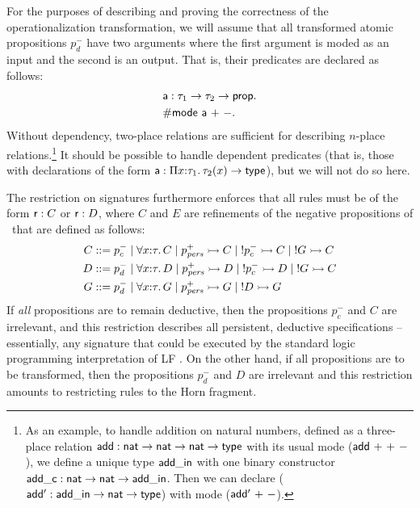 For the purposes of describing and proving the correctness of the
operationalization transformation, we will assume that all transformed
atomic propositions $p_d^-$ have two arguments where the first
argument is moded as an input and the second is an output. That is,
their predicates are declared as follows:
\begin{align*}
& {\sf a} : \tau_1 \rightarrow \tau_2 \rightarrow {\sf prop}.\\
& {\sf \#mode~a~{+}~{-}}.
\end{align*}
Without dependency, two-place relations are sufficient for describing
$n$-place relations.\footnote{As an example, to handle addition on
  natural numbers, defined as a three-place relation ${\sf add} : {\sf
    nat} \rightarrow {\sf nat} \rightarrow {\sf nat} \rightarrow {\sf
    type}$ with its usual mode (${\sf add}~{+}~{+}~{-}$), we define a
  unique type ${\sf add\_in}$ with one binary constructor ${\sf
    add\_c} : {\sf nat} \rightarrow {\sf nat} \rightarrow {\sf
    add\_in}$. Then we can declare (${\sf add'} : {\sf add\_in}
  \rightarrow {\sf nat} \rightarrow {\sf type}$) with mode (${\sf
    add'}~{+}~{-}$).}  It should be possible to handle dependent
predicates (that is, those with declarations of the form ${\sf a} :
\Pi x{:}\tau_1.\,\tau_2(x) \rightarrow {\sf type}$), but we will not do
so here.

The restriction on signatures furthermore enforces that all rules must
be of the form ${\sf r} : C$ or ${\sf r} : D$, where $C$ and $E$ are
refinements of the negative propositions of \sls~that are defined as
follows:
\begin{align*}
C & ::= p^-_{c} 
    \mid \forall x{:}\tau.\, C
    \mid p^+_{\it pers} \rightarrowtail C
    \mid {!}p^-_c \rightarrowtail C
    \mid {!}G \rightarrowtail C \\
D & ::= p^-_{d}
    \mid \forall x{:}\tau.\, D
    \mid p^+_{\it pers} \rightarrowtail D
    \mid {!}p^-_c \rightarrowtail D
    \mid {!}G \rightarrowtail C \\
G & ::= p^-_d 
    \mid \forall x{:}\tau.\, G
    \mid p^+_{\it pers} \rightarrowtail G
    \mid {!}D \rightarrowtail G
\end{align*}
If {\it all} propositions are to remain deductive, then the
propositions $p^-_c$ and $C$ are irrelevant, and this restriction
describes all persistent, deductive specifications -- essentially, any
signature that could be executed by the standard logic programming
interpretation of LF \cite{pfenning98elf}. On the other hand, if all
propositions are to be transformed, then the propositions $p^-_d$ and
$D$ are irrelevant and this restriction amounts to restricting
rules to the Horn fragment.

